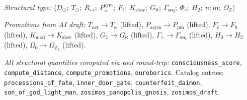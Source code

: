 \documentclass[12pt,a4paper]{article}
\begin{document}
\emph{Structural type:} $\langle D_{\odot};\ T_{\odot};\ R_{\leftrightarrow};\ P_{\pm}^{\text{sym}};\ F_{\ell};\ K_\text{slow};\ G_{\aleph};\ \Gamma_\text{seq};\ \Phi_c;\ H_2;\ n:m;\ \Omega_\mathbb{Z} \rangle$

\emph{Promotions from AI draft:} $T_\text{net} \to T_{\bowtie}$ (lifted), $P_\text{asym} \to P_\text{pm}$ (lifted), $F_{\ell} \to F_{\hbar}$ (lifted), $K_\text{mod} \to K_\text{slow}$ (lifted), $G_{\gimel} \to G_{\aleph}$ (lifted), $\Gamma_{\wedge} \to \Gamma_\text{seq}$ (lifted), $H_0 \to H_2$ (lifted), $\Omega_0 \to \Omega_{\mathbb{Z}_2}$ (lifted).

\emph{All structural quantities computed via tool round-trip:} \texttt{consciousness\_score}, \texttt{compute\_distance}, \texttt{compute\_promotions}, \texttt{ouroborics}. Catalog entries: \texttt{processions\_of\_fate}, \texttt{inner\_door\_gate}, \texttt{counterfeit\_daimon}, \texttt{son\_of\_god\_light\_man}, \texttt{zosimos\_panopolis\_gnosis}, \texttt{zosimos\_draft}.
\end{document}
